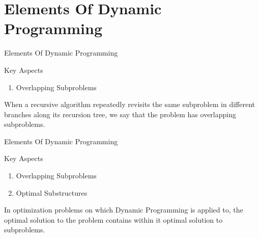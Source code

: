 \section{Elements Of Dynamic Programming}

\begin{frame}{Elements Of Dynamic Programming}
  \begin{block}{Key Aspects}
    \begin{enumerate}
      \item Overlapping Subproblems
    \end{enumerate}
    \pause
    When a recursive algorithm repeatedly revisits the same subproblem in different branches along its recursion
    tree, we say that the problem has overlapping subproblems.
  \end{block}
\end{frame}

\begin{frame}{Elements Of Dynamic Programming}
  \begin{block}{Key Aspects}
    \begin{enumerate}
      \item Overlapping Subproblems
      \item Optimal Substructures
    \end{enumerate}
    \pause
    In optimization problems on which Dynamic Programming is applied to, the optimal solution to the problem contains 
    within it optimal solution to subproblems.
  \end{block}
\end{frame}
